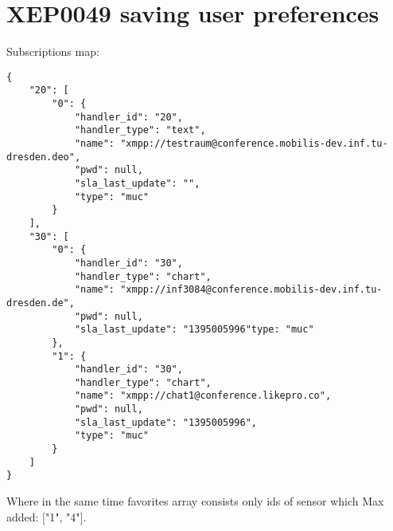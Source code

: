 \chapter{XEP0049 saving user preferences}
Subscriptions map:
\begin{lstlisting}
{
    "20": [
        "0": {
            "handler_id": "20",
            "handler_type": "text",
            "name": "xmpp://testraum@conference.mobilis-dev.inf.tu-dresden.deo",
            "pwd": null,
            "sla_last_update": "",
            "type": "muc"
        }
    ],
    "30": [
        "0": {
            "handler_id": "30",
            "handler_type": "chart",
            "name": "xmpp://inf3084@conference.mobilis-dev.inf.tu-dresden.de",
            "pwd": null,
            "sla_last_update": "1395005996"type: "muc"
        },
        "1": {
            "handler_id": "30",
            "handler_type": "chart",
            "name": "xmpp://chat1@conference.likepro.co",
            "pwd": null,
            "sla_last_update": "1395005996",
            "type": "muc"
        }
    ]
}
\end{lstlisting}
Where in the same time favorites array consists only ids of sensor which Max added: ["1", "4"].

